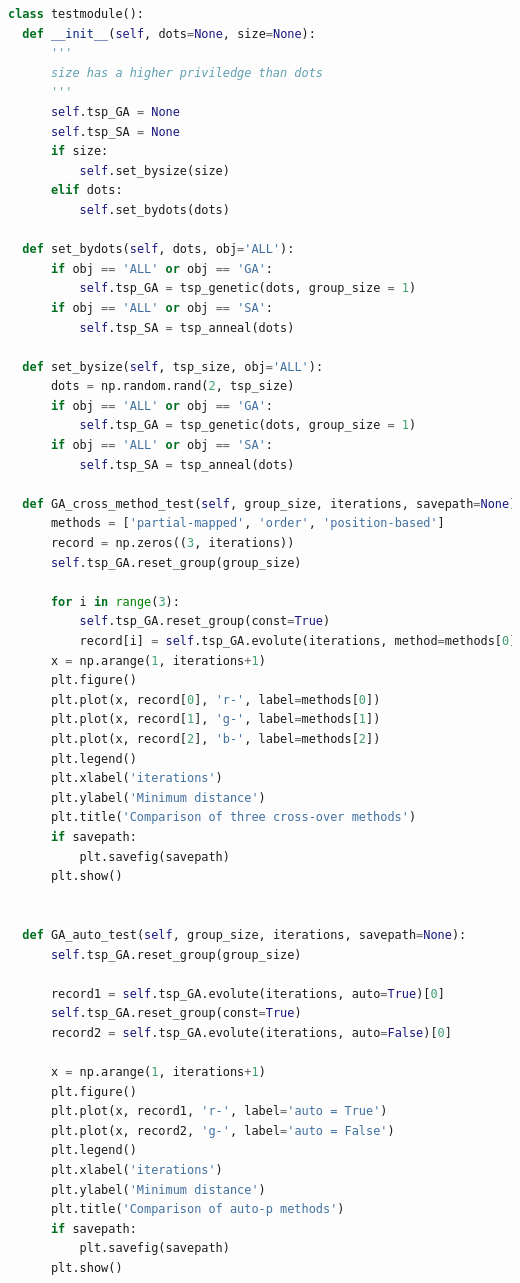 \documentclass[12pt]{article}
\begin{document}
\begin{lstlisting}[language = Python, caption = 测试模块代码]
  class testmodule():
  def __init__(self, dots=None, size=None):
      '''
      size has a higher priviledge than dots
      '''
      self.tsp_GA = None
      self.tsp_SA = None
      if size:
          self.set_bysize(size)
      elif dots:
          self.set_bydots(dots)

  def set_bydots(self, dots, obj='ALL'):
      if obj == 'ALL' or obj == 'GA':
          self.tsp_GA = tsp_genetic(dots, group_size = 1)
      if obj == 'ALL' or obj == 'SA':
          self.tsp_SA = tsp_anneal(dots)

  def set_bysize(self, tsp_size, obj='ALL'):
      dots = np.random.rand(2, tsp_size)
      if obj == 'ALL' or obj == 'GA':
          self.tsp_GA = tsp_genetic(dots, group_size = 1)
      if obj == 'ALL' or obj == 'SA':
          self.tsp_SA = tsp_anneal(dots)

  def GA_cross_method_test(self, group_size, iterations, savepath=None):
      methods = ['partial-mapped', 'order', 'position-based']
      record = np.zeros((3, iterations))
      self.tsp_GA.reset_group(group_size)

      for i in range(3):
          self.tsp_GA.reset_group(const=True)
          record[i] = self.tsp_GA.evolute(iterations, method=methods[0])[0]
      x = np.arange(1, iterations+1)
      plt.figure()
      plt.plot(x, record[0], 'r-', label=methods[0])
      plt.plot(x, record[1], 'g-', label=methods[1])
      plt.plot(x, record[2], 'b-', label=methods[2])
      plt.legend()
      plt.xlabel('iterations')
      plt.ylabel('Minimum distance')
      plt.title('Comparison of three cross-over methods')
      if savepath:
          plt.savefig(savepath)
      plt.show()


  def GA_auto_test(self, group_size, iterations, savepath=None):
      self.tsp_GA.reset_group(group_size)

      record1 = self.tsp_GA.evolute(iterations, auto=True)[0]
      self.tsp_GA.reset_group(const=True)
      record2 = self.tsp_GA.evolute(iterations, auto=False)[0]

      x = np.arange(1, iterations+1)
      plt.figure()
      plt.plot(x, record1, 'r-', label='auto = True')
      plt.plot(x, record2, 'g-', label='auto = False')
      plt.legend()
      plt.xlabel('iterations')
      plt.ylabel('Minimum distance')
      plt.title('Comparison of auto-p methods')
      if savepath:
          plt.savefig(savepath)
      plt.show()


\end{lstlisting}
\end{document}
